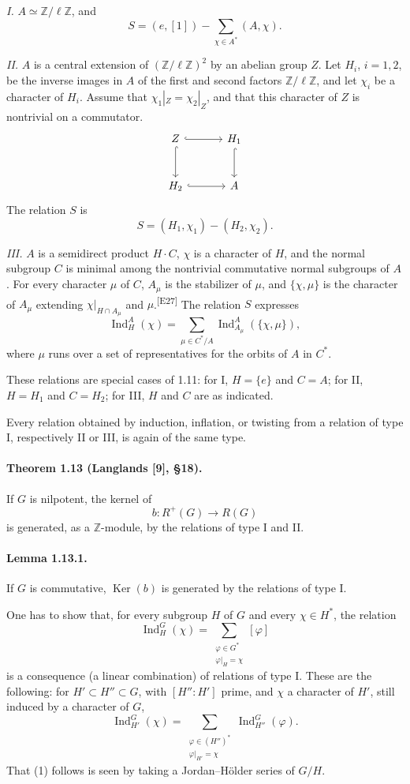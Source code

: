 \documentclass[10pt,letterpaper]{article}
\newcommand{\Z}{\mathbb Z}
\newcommand{\Ind}{\operatorname{Ind}}
\providecommand{\Ker}{\operatorname{Ker}}
\providecommand{\Ind}{\operatorname{Ind}}
\providecommand{\Ker}{\operatorname{Ker}}
\newcommand{\auditmark}[1]{\textsuperscript{\normalfont\scriptsize[E#1]}}
\begin{document}
\emph{I.} \(A\simeq\Z/\ell\Z\), and
\[
S=(e,[1])-\sum_{\chi\in A^*}(A,\chi).
\]

\emph{II.} \(A\) is a central extension of \((\Z/\ell\Z)^2\) by an abelian group \(Z\). Let \(H_i\), \(i=1,2\), be the inverse images in \(A\) of the first and second factors \(\Z/\ell\Z\), and let \(\chi_i\) be a character of \(H_i\). Assume that \(\chi_1|_Z=\chi_2|_Z\), and that this character of \(Z\) is nontrivial on a commutator.
\[
\begin{tikzcd}[column sep=3.2em,row sep=2.7em]
Z \arrow[r,hook] \arrow[d,hook] & H_1 \arrow[d,hook]\\
H_2 \arrow[r,hook] & A
\end{tikzcd}
\]
The relation \(S\) is
\[
S=(H_1,\chi_1)-(H_2,\chi_2).
\]

\emph{III.} \(A\) is a semidirect product \(H\cdot C\), \(\chi\) is a character of \(H\), and the normal subgroup \(C\) is minimal among the nontrivial commutative normal subgroups of \(A\). For every character \(\mu\) of \(C\), \(A_\mu\) is the stabilizer of \(\mu\), and \(\{\chi,\mu\}\) is the character of \(A_\mu\) extending \(\chi|_{H\cap A_\mu}\) and \(\mu\).\auditmark{27} The relation \(S\) expresses
\[
\Ind_H^A(\chi)=
\sum_{\mu\in C^*/A}
\Ind_{A_\mu}^A(\{\chi,\mu\}),
\]
where \(\mu\) runs over a set of representatives for the orbits of \(A\) in \(C^*\).

These relations are special cases of 1.11: for I, \(H=\{e\}\) and \(C=A\); for II, \(H=H_1\) and \(C=H_2\); for III, \(H\) and \(C\) are as indicated.

Every relation obtained by induction, inflation, or twisting from a relation of type I, respectively II or III, is again of the same type.

\paragraph{Theorem 1.13 (Langlands [9], §18).} If \(G\) is nilpotent, the kernel of
\[
b:R^+(G)\longrightarrow R(G)
\]
is generated, as a \(\Z\)-module, by the relations of type I and II.

\paragraph{Lemma 1.13.1.} If \(G\) is commutative, \(\Ker(b)\) is generated by the relations of type I.

One has to show that, for every subgroup \(H\) of \(G\) and every \(\chi\in H^*\), the relation
\[
\tag{1}
\Ind_H^G(\chi)=
\sum_{\substack{\varphi\in G^*\\ \varphi|_H=\chi}}[\varphi]
\]
is a consequence (a linear combination) of relations of type I. These are the following: for \(H'\subset H''\subset G\), with \([H'':H']\) prime, and \(\chi\) a character of \(H'\), still induced by a character of \(G\),
\[
\Ind_{H'}^G(\chi)=
\sum_{\substack{\varphi\in (H'')^*\\ \varphi|_{H'}=\chi}}
\Ind_{H''}^G(\varphi).
\]
That (1) follows is seen by taking a Jordan--Hölder series of \(G/H\).
\end{document}
